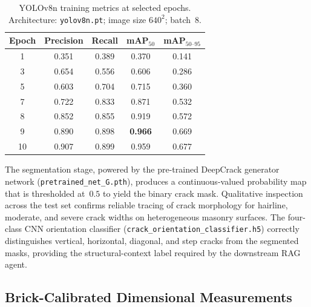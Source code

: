 \begin{table}[ht]
\centering
\caption{YOLOv8n training metrics at selected epochs.
         Architecture: \texttt{yolov8n.pt}; image size $640^2$; batch~8.}
\label{tab:yolo_training}
\begin{tabular}{ccccc}
\toprule
\textbf{Epoch} & \textbf{Precision} & \textbf{Recall}
               & \textbf{mAP$_{50}$} & \textbf{mAP$_{50\text{--}95}$} \\
\midrule
1  & 0.351 & 0.389 & 0.370 & 0.141 \\
3  & 0.654 & 0.556 & 0.606 & 0.286 \\
5  & 0.603 & 0.704 & 0.715 & 0.360 \\
7  & 0.722 & 0.833 & 0.871 & 0.532 \\
8  & 0.852 & 0.855 & 0.919 & 0.572 \\
9  & 0.890 & 0.898 & \textbf{0.966} & 0.669 \\
10 & 0.907 & 0.899 & 0.959 & 0.677 \\
\bottomrule
\end{tabular}
\end{table}

\begin{sloppypar}
The segmentation stage, powered by the pre-trained DeepCrack generator network
(\texttt{pretrained\_net\_G.pth}), produces a continuous-valued probability map
that is thresholded at~$0.5$ to yield the binary crack mask.
Qualitative inspection across the test set confirms reliable tracing of crack
morphology for hairline, moderate, and severe crack widths on heterogeneous
masonry surfaces.
The four-class CNN orientation classifier (\texttt{crack\_orientation\_classifier.h5})
correctly distinguishes vertical, horizontal, diagonal, and step cracks from the
segmented masks, providing the structural-context label required by the downstream
RAG agent.
\end{sloppypar}

\subsection{Brick-Calibrated Dimensional Measurements}
\label{subsec:measurement_results}

